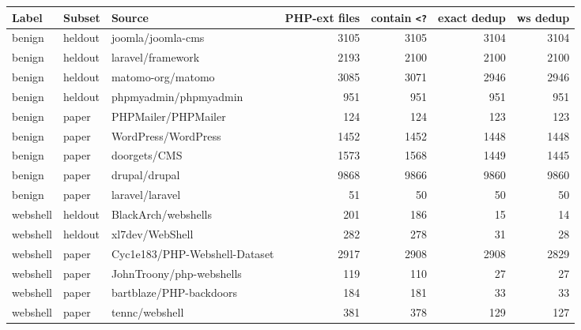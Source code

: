 \begin{tabular}{@{}lllrrrr@{}}
\toprule
Label & Subset & Source & PHP-ext files & contain \texttt{<?} & exact dedup & ws dedup \\ \midrule
benign & heldout & joomla/joomla-cms & 3105 & 3105 & 3104 & 3104 \\
benign & heldout & laravel/framework & 2193 & 2100 & 2100 & 2100 \\
benign & heldout & matomo-org/matomo & 3085 & 3071 & 2946 & 2946 \\
benign & heldout & phpmyadmin/phpmyadmin & 951 & 951 & 951 & 951 \\
benign & paper & PHPMailer/PHPMailer & 124 & 124 & 123 & 123 \\
benign & paper & WordPress/WordPress & 1452 & 1452 & 1448 & 1448 \\
benign & paper & doorgets/CMS & 1573 & 1568 & 1449 & 1445 \\
benign & paper & drupal/drupal & 9868 & 9866 & 9860 & 9860 \\
benign & paper & laravel/laravel & 51 & 50 & 50 & 50 \\
webshell & heldout & BlackArch/webshells & 201 & 186 & 15 & 14 \\
webshell & heldout & xl7dev/WebShell & 282 & 278 & 31 & 28 \\
webshell & paper & Cyc1e183/PHP-Webshell-Dataset & 2917 & 2908 & 2908 & 2829 \\
webshell & paper & JohnTroony/php-webshells & 119 & 110 & 27 & 27 \\
webshell & paper & bartblaze/PHP-backdoors & 184 & 181 & 33 & 33 \\
webshell & paper & tennc/webshell & 381 & 378 & 129 & 127 \\
\bottomrule
\end{tabular}

